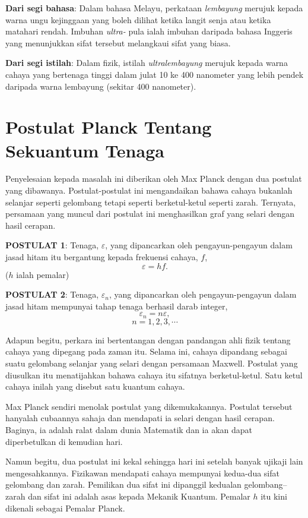 \documentclass[
]{book}
\begin{document}

\textbf{Dari segi bahasa}: Dalam bahasa Melayu, perkataan
\emph{lembayung} merujuk kepada warna ungu kejinggaan yang boleh dilihat
ketika langit senja atau ketika matahari rendah. Imbuhan \emph{ultra-}
pula ialah imbuhan daripada bahasa Inggeris yang menunjukkan sifat
tersebut melangkaui sifat yang biasa.

\textbf{Dari segi istilah}: Dalam fizik, istilah \emph{ultralembayung}
merujuk kepada warna cahaya yang bertenaga tinggi dalam julat 10 ke 400
nanometer yang lebih pendek daripada warna lembayung (sekitar 400
nanometer).


\hypertarget{sec:postulat-planck}{%
\section{Postulat Planck Tentang Sekuantum
Tenaga}\label{sec:postulat-planck}}

Penyelesaian kepada masalah ini diberikan oleh Max Planck dengan dua
postulat yang dibawanya. Postulat-postulat ini mengandaikan bahawa
cahaya bukanlah selanjar seperti gelombang tetapi seperti berketul-ketul
seperti zarah. Ternyata, persamaan yang muncul dari postulat ini
menghasilkan graf yang selari dengan hasil cerapan.

\textbf{POSTULAT 1}: Tenaga, \(\varepsilon\), yang dipancarkan oleh
pengayun-pengayun dalam jasad hitam itu bergantung kepada frekuensi
cahaya, \(f\), \[\varepsilon = hf.\] (\(h\) ialah pemalar)

\textbf{POSTULAT 2}: Tenaga, \(\varepsilon_n\), yang dipancarkan oleh
pengayun-pengayun dalam jasad hitam mempunyai tahap tenaga berhasil
darab integer, \[\varepsilon_n = n\varepsilon,\] \[n=1,2,3,\cdots\]

Adapun begitu, perkara ini bertentangan dengan pandangan ahli fizik
tentang cahaya yang dipegang pada zaman itu. Selama ini, cahaya
dipandang sebagai suatu gelombang selanjar yang selari dengan persamaan
Maxwell. Postulat yang diusulkan itu menatijahkan bahawa cahaya itu
sifatnya berketul-ketul. Satu ketul cahaya inilah yang disebut satu
kuantum cahaya.

Max Planck sendiri menolak postulat yang dikemukakannya. Postulat
tersebut hanyalah cubaannya sahaja dan mendapati ia selari dengan hasil
cerapan. Baginya, ia adalah ralat dalam dunia Matematik dan ia akan
dapat diperbetulkan di kemudian hari.

Namun begitu, dua postulat ini kekal sehingga hari ini setelah banyak
ujikaji lain mengesahkannya. Fizikawan mendapati cahaya mempunyai
kedua-dua sifat gelombang dan zarah. Pemilikan dua sifat ini dipanggil
kedualan gelombang--zarah dan sifat ini adalah asas kepada Mekanik
Kuantum. Pemalar \(h\) itu kini dikenali sebagai Pemalar Planck.
\end{document}
